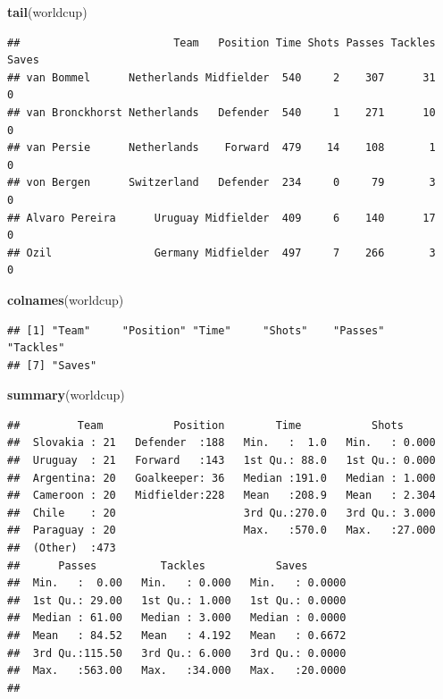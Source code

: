 \documentclass[]{book}
\makeatletter
\newenvironment{Shaded}{\begin{snugshade}}{\end{snugshade}}
\newcommand{\KeywordTok}[1]{\textcolor[rgb]{0.13,0.29,0.53}{\textbf{{#1}}}}
\newcommand{\NormalTok}[1]{{#1}}
\newenvironment{kframe}{%
\medskip{}
\setlength{\fboxsep}{.8em}
 \def\at@end@of@kframe{}%
 \ifinner\ifhmode%
  \def\at@end@of@kframe{\end{minipage}}%
  \begin{minipage}{\columnwidth}%
 \fi\fi%
 \def\FrameCommand##1{\hskip\@totalleftmargin \hskip-\fboxsep
 \colorbox{shadecolor}{##1}\hskip-\fboxsep
     \hskip-\linewidth \hskip-\@totalleftmargin \hskip\columnwidth}%
 \MakeFramed {\advance\hsize-\width
   \@totalleftmargin\z@ \linewidth\hsize
   \@setminipage}}%
 {\par\unskip\endMakeFramed%
 \at@end@of@kframe}
\renewenvironment{Shaded}{\begin{kframe}}{\end{kframe}}
\makeatother
\begin{document}
\begin{Shaded}
\begin{Highlighting}[]
\KeywordTok{tail}\NormalTok{(worldcup)}
\end{Highlighting}
\end{Shaded}

\begin{verbatim}
##                        Team   Position Time Shots Passes Tackles Saves
## van Bommel      Netherlands Midfielder  540     2    307      31     0
## van Bronckhorst Netherlands   Defender  540     1    271      10     0
## van Persie      Netherlands    Forward  479    14    108       1     0
## von Bergen      Switzerland   Defender  234     0     79       3     0
## Alvaro Pereira      Uruguay Midfielder  409     6    140      17     0
## Ozil                Germany Midfielder  497     7    266       3     0
\end{verbatim}

\begin{Shaded}
\begin{Highlighting}[]
\KeywordTok{colnames}\NormalTok{(worldcup)}
\end{Highlighting}
\end{Shaded}

\begin{verbatim}
## [1] "Team"     "Position" "Time"     "Shots"    "Passes"   "Tackles" 
## [7] "Saves"
\end{verbatim}

\begin{Shaded}
\begin{Highlighting}[]
\KeywordTok{summary}\NormalTok{(worldcup)}
\end{Highlighting}
\end{Shaded}

\begin{verbatim}
##         Team           Position        Time           Shots       
##  Slovakia : 21   Defender  :188   Min.   :  1.0   Min.   : 0.000  
##  Uruguay  : 21   Forward   :143   1st Qu.: 88.0   1st Qu.: 0.000  
##  Argentina: 20   Goalkeeper: 36   Median :191.0   Median : 1.000  
##  Cameroon : 20   Midfielder:228   Mean   :208.9   Mean   : 2.304  
##  Chile    : 20                    3rd Qu.:270.0   3rd Qu.: 3.000  
##  Paraguay : 20                    Max.   :570.0   Max.   :27.000  
##  (Other)  :473                                                    
##      Passes          Tackles           Saves        
##  Min.   :  0.00   Min.   : 0.000   Min.   : 0.0000  
##  1st Qu.: 29.00   1st Qu.: 1.000   1st Qu.: 0.0000  
##  Median : 61.00   Median : 3.000   Median : 0.0000  
##  Mean   : 84.52   Mean   : 4.192   Mean   : 0.6672  
##  3rd Qu.:115.50   3rd Qu.: 6.000   3rd Qu.: 0.0000  
##  Max.   :563.00   Max.   :34.000   Max.   :20.0000  
## 
\end{verbatim}
\end{document}
